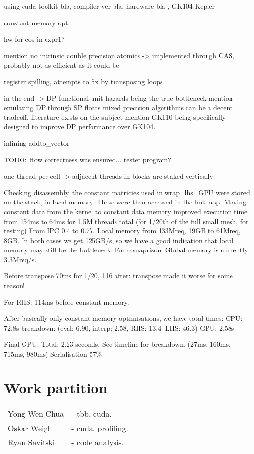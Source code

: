 \documentclass[11pt, oneside, a4paper]{article}
\begin{document}
using cuda toolkit bla, compiler ver bla, hardware bla , GK104 Kepler

constant memory opt

hw for cos in expr1? 

mention no intrinsic double precision atomics -> implemented through CAS, probably not as efficient as it could be

register spilling, attempts to fix by transposing loops

in the end -> DP functional unit hazards being the true bottleneck
mention emulating DP through SP floats
mixed precision algorithms can be a decent tradeoff, literature exists on the subject
mention GK110 being specifically designed to improve DP performance over GK104.

inlining addto\_vector

TODO: How correctness was ensured... tester program?

one thread per cell -> adjacent threads in blocks are staked vertically

Checking disassembly, the constant matricies used in wrap\_lhs\_GPU were stored on the stack, in local memory. These were then accessed in the hot loop.
Moving constant data from the kernel to constant data memory improved execution time from 154ms to 64ms for 1.5M threads total (for 1/20th of the full small mesh, for testing)
From IPC 0.4 to 0.77.
Local memory from 133Mreq, 19GB to 61Mreq, 8GB.
In both cases we get 125GB/s, so we have a good indication that local memory may still be the bottleneck.
For comaprison, Global memory is currently 3.3Mreq/s.

Before transpose 70ms for 1/20, 116 after: transpose made it worse for some reason!

For RHS: 114ms before constant memory.

After basically only constant memory optimisations, we have total times:
CPU: 72.8s breakdown: (eval: 6.90, interp: 2.58, RHS: 13.4, LHS: 46.3)
GPU: 2.58s


Final GPU:
Total: 2.23 seconds. See timeline for breakdown. (27ms, 160ms, 715ms, 980ms)
Serialisation 57\%



\section{Work partition} %
\label{sec:work_partition}
\begin{tabular}{ l l  }
Yong Wen Chua & - tbb, cuda. \\
Oskar Weigl & - cuda, profiling. \\
Ryan Savitski & - code analysis. \\
\end{tabular}
\end{document}
